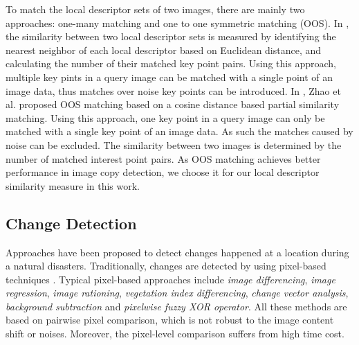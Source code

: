 \documentclass[runningheads,a4paper]{llncs}
\begin{document}
To match the local descriptor sets of two images, there are mainly two approaches: one-many matching and one to one symmetric matching (OOS). In \cite{790410}, the similarity between two local descriptor sets is measured by identifying the nearest neighbor of each local descriptor based on Euclidean distance, and calculating the number of their matched key point pairs. Using this approach, multiple key pints in a query image can be matched with a single point of an image data, thus matches over noise key points can be introduced. In \cite{WuZhaoNgoIEEEMM07}, Zhao et al. proposed OOS matching based on a cosine distance based partial similarity matching. Using this approach, one key point in a query image can only be matched with a single key point of an image data. As such the matches caused by noise can be excluded. The similarity between two images is determined by the number of matched interest point pairs. As OOS matching achieves better performance in image copy detection, we choose it for our local descriptor similarity measure in this work.

\subsection{Change Detection}\label{sec:ChangeDetection}

Approaches have been proposed to detect changes happened at a location during a natural disasters. Traditionally, changes are detected by using pixel-based techniques \cite{ilsever2012two}. Typical pixel-based approaches include \textit{image differencing}, \textit{image regression}, \textit{image rationing}, \textit{vegetation index differencing}, \textit{change vector analysis}, \textit{background subtraction} and \emph{pixelwise fuzzy XOR operator}. All these methods are based on pairwise pixel comparison, which is not robust to the image content shift or noises. Moreover, the pixel-level comparison suffers from high time cost.
\end{document}
